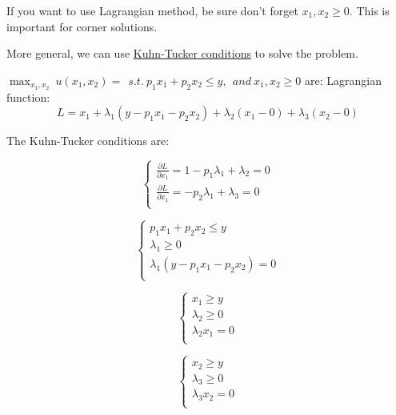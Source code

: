 \documentclass{article}
\begin{document}
\begin{mdframed}[backgroundcolor=blue!20,linecolor=white]
If you want to use Lagrangian method, be sure don't forget $x_1, x_2 \ge 0$.
This is important for corner solutions.

More general, we can use \href{https://mjo.osborne.economics.utoronto.ca/index.php/tutorial/index/1/ktc/t}{Kuhn-Tucker conditions} to solve the problem.

$\max_{x_1,x_2} \ u(x_1,x_2) =  \ \ s.t. \ p_1x_1 + p_2x_2 \le y,
\ \ and \ x_1, x_2 \ge 0 $ are:
Lagrangian function:
$$L = x_1 + \lambda_1(y - p_1x_1 - p_2x_2) + \lambda_2(x_1-0)+ \lambda_3(x_2-0)$$

The Kuhn-Tucker conditions are:

\begin{equation}
  \begin{cases}
    \frac{\partial L}{\partial x_1} = 1-p_1\lambda_1 + \lambda_2 =0 \\
    \frac{\partial L}{\partial x_1} = -p_2\lambda_1 + \lambda_3 =0 \\
  \end{cases}
  \label{eq:L1}
\end{equation}

\begin{equation}
  \begin{cases}
    p_1x_1 + p_2x_2 \le y \\
    \lambda_1 \ge 0 \\
    \lambda_1(y - p_1x_1 - p_2x_2) =0 \\
  \end{cases}
   \label{eq:L2}
\end{equation}

\begin{equation}
  \begin{cases}
    x_1 \ge y \\
    \lambda_2 \ge 0 \\
    \lambda_2 x_1 =0 \\
  \end{cases}
   \label{eq:L3}
\end{equation}

\begin{equation}
  \begin{cases}
    x_2 \ge y \\
    \lambda_3 \ge 0 \\
    \lambda_3 x_2 =0 \\
  \end{cases}
   \label{eq:L4}
\end{equation}


\end{mdframed}
\end{document}
